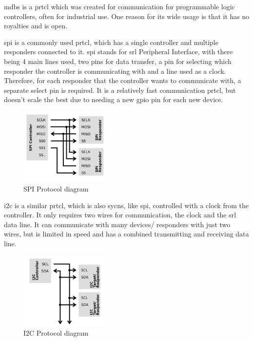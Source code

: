 \documentclass[a4paper,11pt]{report}
\begin{document}
\gls{mdbs} is a \gls{prtcl} which was created for communication for programmable logic controllers, often for industrial use. One reason for its wide usage is that it has no royalties and is open.

\gls{spi} is a commonly used \gls{prtcl}, which has a single controller and multiple responders connected to it. \gls{spi} stands for \gls{srl} Peripheral Interface, with there being 4 main lines used, two pins for data transfer, a pin for selecting which responder the controller is communicating with and a line used as a clock. Therefore, for each responder that the controller wants to communicate with, a separate select pin is required. It is a relatively fast communication \gls{prtcl}, but doesn't scale the best due to needing a new \gls{gpio} pin for each new device.

\begin{figure}[H]
\centering
\includegraphics[width=0.4\textwidth]{SPI}
\caption{SPI Protocol diagram}
\end{figure}

\gls{i2c} is a similar \gls{prtcl}, which is also \gls{sycns}, like \gls{spi}, controlled with a clock from the controller. It only requires two wires for communication, the clock and the \gls{srl} data line. It can communicate with many devices/ responders with just two wires, but is limited in speed and has a combined transmitting and receiving data line.

\begin{figure}[H]
\centering
\includegraphics[width=0.4\textwidth]{I2C}
\caption{I2C Protocol diagram}
\end{figure}
\end{document}
